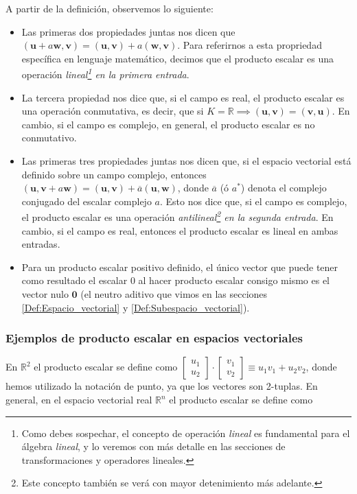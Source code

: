 \documentclass[12pt]{article}
\begin{document}
A partir de la definición, observemos lo siguiente:

\begin{itemize}
    \item Las primeras dos propiedades juntas nos dicen que $(\mathbf{u}+a\mathbf{w},\mathbf{v}) = (\mathbf{u},\mathbf{v})+a(\mathbf{w},\mathbf{v})$. Para referirnos a esta propriedad específica en lenguaje matemático, decimos que el producto escalar es una operación \textit{lineal\footnote{Como debes sospechar, el concepto de operación \emph{lineal} es fundamental para el álgebra \emph{lineal}, y lo veremos con más detalle en las secciones de transformaciones y operadores lineales.} en la primera entrada}.
    \item La tercera propiedad nos dice que, si el campo es real, el producto escalar es una operación conmutativa, es decir, que si $K=\mathbb{R}\implies(\mathbf{u},\mathbf{v})=(\mathbf{v},\mathbf{u})$. En cambio, si el campo es complejo, en general, el producto escalar es no conmutativo.
    \item Las primeras tres propiedades juntas nos dicen que, si el espacio vectorial está definido sobre un campo complejo, entonces $(\mathbf{u},\mathbf{v}+a\mathbf{w}) = (\mathbf{u},\mathbf{v})+\overline{a}(\mathbf{u},\mathbf{w})$, donde $\overline{a}$ (ó $a^*$) denota el complejo conjugado del escalar complejo $a$. Esto nos dice que, si el campo es complejo, el producto escalar es una operación \textit{antilineal\footnote{Este concepto también se verá con mayor detenimiento más adelante.} en la segunda entrada}. En cambio, si el campo es real, entonces el producto escalar es lineal en ambas entradas.
    \item Para un producto escalar positivo definido, el único vector que puede tener como resultado el escalar $0$ al hacer producto escalar consigo mismo es el vector nulo $\mathbf{0}$ (el neutro aditivo que vimos en las secciones \ref{Def:Espacio_vectorial} y \ref{Def:Subespacio_vectorial}).
\end{itemize}


\subsubsection{Ejemplos de producto escalar en espacios vectoriales} \label{Ejem:Producto_escalar}

En $\mathbb{R}^2$ el producto escalar se define como $\begin{bmatrix}u_1\\u_2\end{bmatrix}\cdot\begin{bmatrix}v_1\\v_2\end{bmatrix} \equiv u_1v_1+u_2v_2$, donde hemos utilizado la notación de punto, ya que los vectores son 2-tuplas. En general, en el espacio vectorial real $\mathbb{R}^n$ el producto escalar se define como
\end{document}
